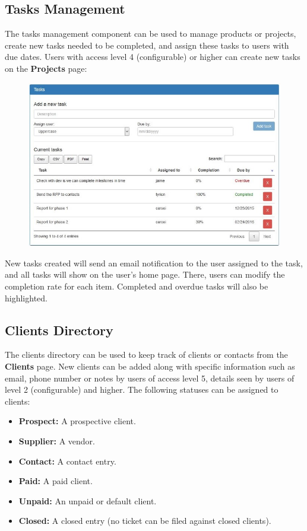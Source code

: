 \documentclass[11pt]{article}
\begin{document}
\subsection{Tasks Management}
The tasks management component can be used to manage products or projects, create new tasks needed to be completed, and assign these tasks to users with due dates. Users with access level 4 (configurable) or higher can create new tasks on the \textbf{Projects} page:

\begin{figure}[h]
\includegraphics{projectmanagement.jpg}
\end{figure}

New tasks created will send an email notification to the user assigned to the task, and all tasks will show on the user's home page. There, users can modify the completion rate for each item. Completed and overdue tasks will also be highlighted.

\subsection{Clients Directory}
The clients directory can be used to keep track of clients or contacts from the \textbf{Clients} page. New clients can be added along with specific information such as email, phone number or notes by users of access level 5, details seen by users of level 2 (configurable) and higher. The following statuses can be assigned to clients:

\begin{itemize}
\item \textbf{Prospect:} A prospective client.
\item \textbf{Supplier:} A vendor.
\item \textbf{Contact:} A contact entry.
\item \textbf{Paid:} A paid client.
\item \textbf{Unpaid:} An unpaid or default client.
\item \textbf{Closed:} A closed entry (no ticket can be filed against closed clients).
\end{itemize}
\end{document}
